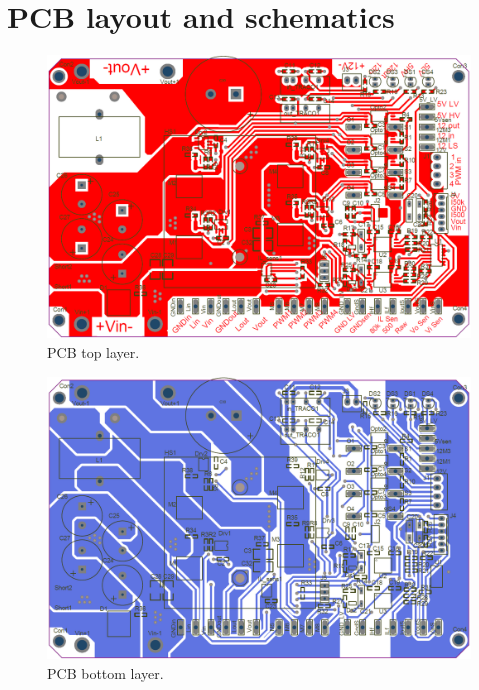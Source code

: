 \chapter{PCB layout and schematics}\label{ch:AppPCB} 

\begin{figure}[H]
	\begin{center}
		\includegraphics[width=1\textwidth]{../Pictures/PCB_TopLayer}
		\caption{PCB top layer.}
		\label{PCB_TopLayer}
	\end{center}	
\end{figure}

\begin{figure}[H]
	\begin{center}
		\includegraphics[width=1\textwidth]{../Pictures/PCB_BottomLayer}
		\caption{PCB bottom layer.}
		\label{PCB_BottomLayer}
	\end{center}	
\end{figure}

